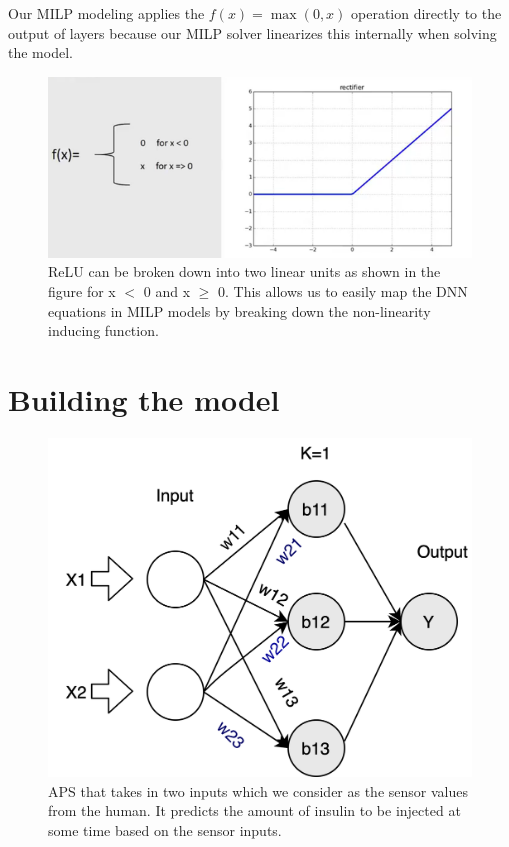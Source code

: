 Our MILP modeling applies the $f(x) = \max(0, x)$ operation directly to the output of layers because our MILP solver linearizes this internally when solving the model.





\begin{figure}
	\centering
	\includegraphics[width=0.7\linewidth]{Images/ReLUbreakdown}
	\caption{ReLU can be broken down into two linear units as shown in the figure for x $<$ 0 and x $\geq$ 0. This allows us to easily map the DNN equations in MILP models by breaking down the non-linearity inducing function.}
	\label{fig:relubreakdown}
\end{figure}

\section{Building the model}
\label{section:attacks}

\begin{figure}
	\centering
	\includegraphics[width=0.7\linewidth]{Images/ToyAPS}
	\caption[APS]{APS that takes in two inputs which we consider as the sensor values from the human. It predicts the amount of insulin to be injected at some time based on the sensor inputs.}
	\label{fig:toyaps}
\end{figure}


